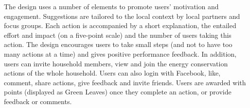 The design uses a number of elements to promote users' motivation and engagement. 
Suggestions are tailored to the local context by local partners and focus groups. 
Each action is accompanied by a short explanation, the entailed effort and impact (on a five-point scale) and the number of users taking this action. 
The design encourages users to take small steps (and not to have too many actions at a time) and gives positive performance feedback. 
In addition, users can invite household members, %
view and join the energy conservation actions of the whole household. %
Users can also login with Facebook, like, comment, share actions, %
give feedback %
and invite friends. Users are awarded with points  (displayed as Green Leaves) once they complete an action, or provide feedback or comments. 



